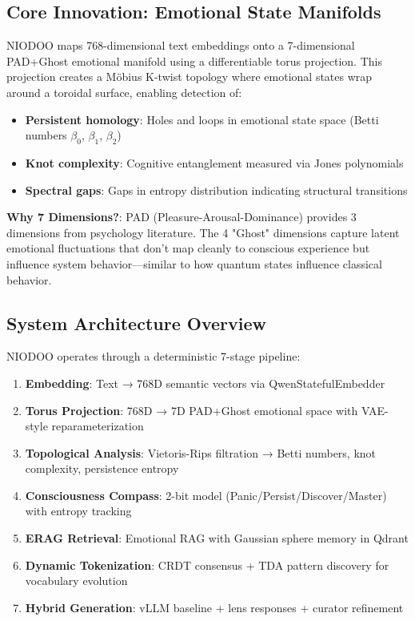 \documentclass[11pt,a4paper]{article}
\begin{document}
\subsection{Core Innovation: Emotional State Manifolds}

NIODOO maps 768-dimensional text embeddings onto a 7-dimensional PAD+Ghost emotional manifold using a differentiable torus projection. This projection creates a Möbius K-twist topology where emotional states wrap around a toroidal surface, enabling detection of:
\begin{itemize}
    \item \textbf{Persistent homology}: Holes and loops in emotional state space (Betti numbers $\beta_0$, $\beta_1$, $\beta_2$)
    \item \textbf{Knot complexity}: Cognitive entanglement measured via Jones polynomials
    \item \textbf{Spectral gaps}: Gaps in entropy distribution indicating structural transitions
\end{itemize}

\textbf{Why 7 Dimensions?}: PAD (Pleasure-Arousal-Dominance) provides 3 dimensions from psychology literature. The 4 "Ghost" dimensions capture latent emotional fluctuations that don't map cleanly to conscious experience but influence system behavior—similar to how quantum states influence classical behavior.

\subsection{System Architecture Overview}

NIODOO operates through a deterministic 7-stage pipeline:

\begin{enumerate}
    \item \textbf{Embedding}: Text → 768D semantic vectors via QwenStatefulEmbedder
    \item \textbf{Torus Projection}: 768D → 7D PAD+Ghost emotional space with VAE-style reparameterization
    \item \textbf{Topological Analysis}: Vietoris-Rips filtration → Betti numbers, knot complexity, persistence entropy
    \item \textbf{Consciousness Compass}: 2-bit model (Panic/Persist/Discover/Master) with entropy tracking
    \item \textbf{ERAG Retrieval}: Emotional RAG with Gaussian sphere memory in Qdrant
    \item \textbf{Dynamic Tokenization}: CRDT consensus + TDA pattern discovery for vocabulary evolution
    \item \textbf{Hybrid Generation}: vLLM baseline + lens responses + curator refinement
\end{enumerate}
\end{document}
